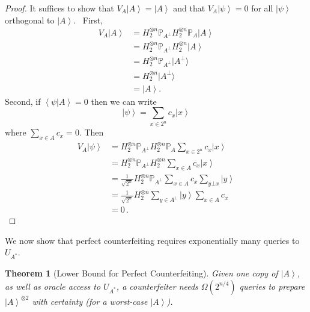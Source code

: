 \documentclass[10pt]{article}
\newtheorem{theorem}{Theorem}[section]
\theoremstyle{definition}
\numberwithin{equation}{section}
\begin{document}
\begin{proof}
It suffices to show that $V_{A}\left\vert A\right\rangle =\left\vert
A\right\rangle $ and that $V_{A}\left\vert \psi\right\rangle =0$ for all
$\left\vert \psi\right\rangle $ orthogonal to $\left\vert A\right\rangle $.
\ First,%
\begin{align*}
V_{A}\left\vert A\right\rangle  &  =H_{2}^{\otimes n}\mathbb{P}_{A^{\bot}%
}H_{2}^{\otimes n}\mathbb{P}_{A}\left\vert A\right\rangle \\
&  =H_{2}^{\otimes n}\mathbb{P}_{A^{\bot}}H_{2}^{\otimes n}\left\vert
A\right\rangle \\
&  =H_{2}^{\otimes n}\mathbb{P}_{A^{\bot}}|A^{\bot}\rangle\\
&  =H_{2}^{\otimes n}|A^{\bot}\rangle\\
&  =\left\vert A\right\rangle .
\end{align*}
Second, if $\left\langle \psi|A\right\rangle =0$ then we can write%
\[
\left\vert \psi\right\rangle =\sum_{x\in2^{n}}{c_{x}\left\vert x\right\rangle
}%
\]
where $\sum_{x\in A}c_{x}=0$. Then%
\begin{align*}
V_{A}\left\vert \psi\right\rangle  &  =H_{2}^{\otimes n}\mathbb{P}_{A^{\bot}%
}H_{2}^{\otimes n}\mathbb{P}_{A}\sum_{x\in2^{n}}{c_{x}\left\vert
x\right\rangle }\\
&  =H_{2}^{\otimes n}\mathbb{P}_{A^{\bot}}H_{2}^{\otimes n}\sum_{x\in A}%
{c_{x}\left\vert x\right\rangle }\\
&  =\frac{1}{\sqrt{2^{n}}}H_{2}^{\otimes n}\mathbb{P}_{A^{\bot}}\sum_{x\in
A}{c_{x}\sum_{y\bot x}\left\vert y\right\rangle }\\
&  =\frac{1}{\sqrt{2^{n}}}H_{2}^{\otimes n}\sum_{y\in A^{\perp}}{\left\vert
y\right\rangle \sum_{x\in A}c_{x}}\\
&  =0\,.
\end{align*}

\end{proof}

We now show that perfect counterfeiting requires exponentially many queries to
$U_{A^{\ast}}$.

\begin{theorem}
[Lower Bound for Perfect Counterfeiting]\label{nocopyc}Given one copy of
$\left\vert A\right\rangle $, as well as oracle access to $U_{A^{\ast}}$, a
counterfeiter needs $\Omega(  2^{n/4})  $ queries to prepare
$\left\vert A\right\rangle ^{\otimes2}$ with certainty (for a worst-case
$\left\vert A\right\rangle $).
\end{theorem}
\end{document}
